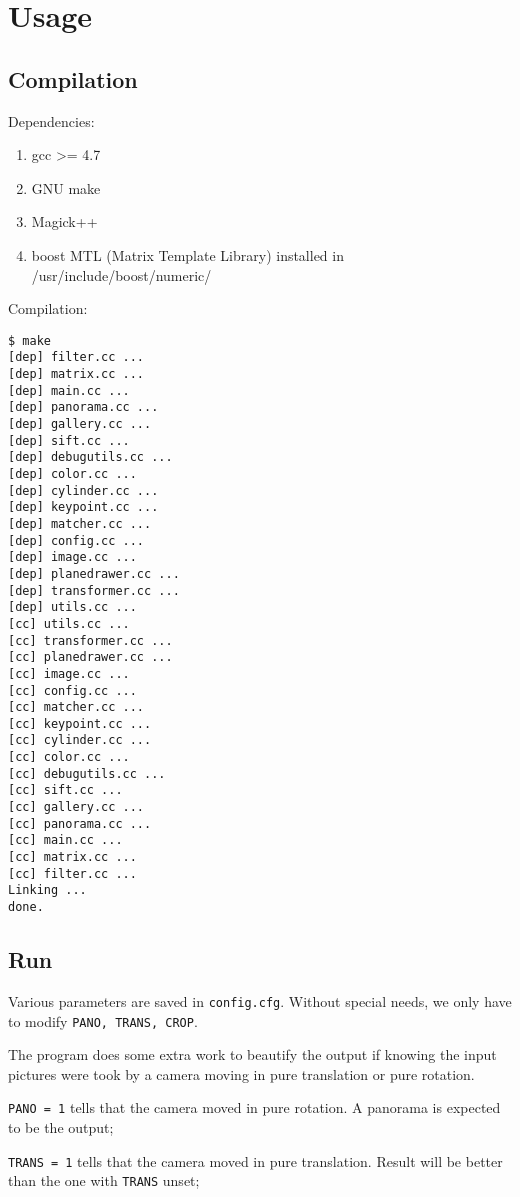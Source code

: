 \section{Usage}
\subsection{Compilation}
Dependencies:

\begin{enumerate}
    \item gcc >= 4.7
    \item GNU make
    \item Magick++
    \item boost MTL (Matrix Template Library) installed in /usr/include/boost/numeric/
\end{enumerate}

Compilation:
\begin{lstlisting}
$ make
[dep] filter.cc ...
[dep] matrix.cc ...
[dep] main.cc ...
[dep] panorama.cc ...
[dep] gallery.cc ...
[dep] sift.cc ...
[dep] debugutils.cc ...
[dep] color.cc ...
[dep] cylinder.cc ...
[dep] keypoint.cc ...
[dep] matcher.cc ...
[dep] config.cc ...
[dep] image.cc ...
[dep] planedrawer.cc ...
[dep] transformer.cc ...
[dep] utils.cc ...
[cc] utils.cc ...
[cc] transformer.cc ...
[cc] planedrawer.cc ...
[cc] image.cc ...
[cc] config.cc ...
[cc] matcher.cc ...
[cc] keypoint.cc ...
[cc] cylinder.cc ...
[cc] color.cc ...
[cc] debugutils.cc ...
[cc] sift.cc ...
[cc] gallery.cc ...
[cc] panorama.cc ...
[cc] main.cc ...
[cc] matrix.cc ...
[cc] filter.cc ...
Linking ...
done.
\end{lstlisting}

\subsection{Run}
Various parameters are saved in \verb|config.cfg|.
Without special needs, we only have to modify \verb|PANO, TRANS, CROP|.

The program does some extra work to beautify the output
if knowing the input pictures were took by a camera
moving in pure translation or pure rotation.

\verb|PANO = 1| tells that the camera moved in pure rotation. A panorama is expected to be the output;

\verb|TRANS = 1| tells that the camera moved in pure translation. Result will be better than the one with \verb|TRANS| unset;

